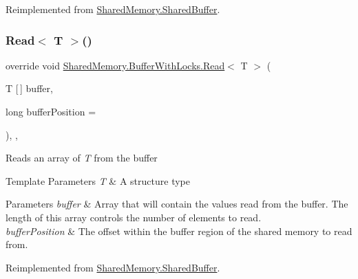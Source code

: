 Reimplemented from \hyperlink{class_shared_memory_1_1_shared_buffer_a27d48f6be3b300882aa9aa71339421be}{Shared\+Memory.\+Shared\+Buffer}.

\mbox{\label{class_shared_memory_1_1_buffer_with_locks_a247e1e8f8f2849b65ee985f3b08cca97}} 
\subsubsection{\texorpdfstring{Read$<$ T $>$()}{Read< T >()}\hspace{0.1cm}{\footnotesize\ttfamily [2/2]}}
{\footnotesize\ttfamily override void \hyperlink{class_shared_memory_1_1_buffer_with_locks_adf97b7891d30d2cc24ea39e232a0b238}{Shared\+Memory.\+Buffer\+With\+Locks.\+Read}$<$ T $>$ (\begin{DoxyParamCaption}\item[{T \mbox{[}$\,$\mbox{]}}]{buffer,  }\item[{long}]{buffer\+Position = {} }\end{DoxyParamCaption})\hspace{0.3cm}{\ttfamily [inline]}, {\ttfamily [protected]}, {\ttfamily [virtual]}}



Reads an array of {\itshape T}  from the buffer 


\begin{DoxyTemplParams}{Template Parameters}
{\em T} & A structure type\\
\hline
\end{DoxyTemplParams}

\begin{DoxyParams}{Parameters}
{\em buffer} & Array that will contain the values read from the buffer. The length of this array controls the number of elements to read.\\
\hline
{\em buffer\+Position} & The offset within the buffer region of the shared memory to read from.\\
\hline
\end{DoxyParams}


Reimplemented from \hyperlink{class_shared_memory_1_1_shared_buffer_aba5489c699f444012792fd6331affb03}{Shared\+Memory.\+Shared\+Buffer}.

